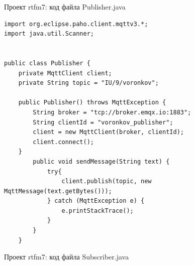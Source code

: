 \documentclass[a4paper, 14pt]{extarticle}
\begin{document}
\par
Проект rtfm7: код файла Publisher.java
\begin{lstlisting}
import org.eclipse.paho.client.mqttv3.*;
import java.util.Scanner;


public class Publisher {
    private MqttClient client;
    private String topic = "IU/9/voronkov";

    public Publisher() throws MqttException {
        String broker = "tcp://broker.emqx.io:1883";
        String clientId = "voronkov_publisher";
        client = new MqttClient(broker, clientId);
        client.connect();
    }
        public void sendMessage(String text) {
            try{
                client.publish(topic, new MqttMessage(text.getBytes()));
            } catch (MqttException e) {
                e.printStackTrace();
            }
        }
    }
\end{lstlisting}
\par
Проект rtfm7: код файла Subscriber.java
\end{document}
